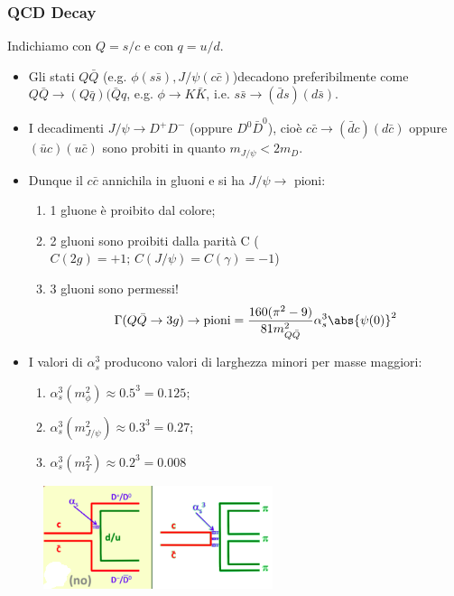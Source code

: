 \subsubsection{QCD Decay}
Indichiamo con $Q=s/c$ e con $q=u/d$.
\begin{itemize}
    \item Gli stati $Q\bar Q$ (e.g. $\phi(s\bar s),J/\psi(c\bar c)$)decadono preferibilmente come $Q\bar Q\to (Q\bar q)(\bar Qq$, e.g. $\phi\to K\bar K$, i.e. $s\bar s\to (\bar ds)(d\bar s)$.
    \item I decadimenti $J/\psi\to D^+D^-$ (oppure $D^0\bar D^0$), cioè $c\bar c\to (\bar dc )(d\bar c)$ oppure $(\bar uc)(u\bar c)$ sono probiti in quanto $m_{J/\psi}<2m_D$.
    \item Dunque il $c\bar c$ annichila in gluoni e si ha $J/\psi\to$ pioni:
    \begin{enumerate}
        \item 1 gluone è proibito dal colore;
        \item 2 gluoni sono proibiti dalla parità C ($C(2g)=+1;\,C(J/\psi)=C(\gamma)=-1$)
        \item 3 gluoni sono permessi!
        \begin{equation*}
        \Gamma(Q\bar Q\to 3g)\to\text{pioni}=\frac{160(\pi^2-9)}{81m_{Q\bar Q}^2}\alpha_s^3\abs{\psi(0)}^2
        \end{equation*}
    \end{enumerate} 
    \item I valori di $\alpha_s^3$ producono valori di larghezza minori per masse maggiori:
    \begin{enumerate}
    \item $\alpha_s^3(m_\phi^2)\approx0.5^3=0.125$;
    \item $\alpha_s^3(m_{J/\psi}^2)\approx0.3^3=0.27$;
    \item $\alpha_s^3(m_\Upsilon^2)\approx0.2^3=0.008$ 
    \end{enumerate}
\end{itemize}
\begin{figure}[H]
    \centering
    \includegraphics[width=0.6\textwidth]{immagini/fig_qcd_decay.png}
\end{figure}

